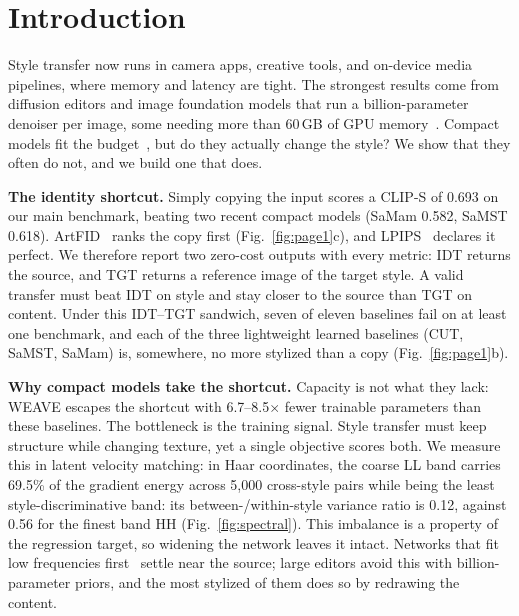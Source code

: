 \documentclass[conference]{IEEEtran}
\newcommand{\clips}{CLIP-S}
\begin{document}
\section{Introduction}
\label{sec:intro}

Style transfer now runs in camera apps, creative tools, and on-device media pipelines, where memory
and latency are tight. The strongest results come from diffusion editors and image foundation models
that run a billion-parameter denoiser per image, some needing more than 60\,GB of GPU
memory~\cite{wu2025qwenimagetechnicalreport,blackforestlabs2025flux2}. Compact models fit the
budget~\cite{wang2023microast,liu2024samst,liu2024samam}, but do they actually change the style? We
show that they often do not, and we build one that does.

\noindent\textbf{The identity shortcut.} Simply copying the input scores a \clips{} of 0.693 on our
main benchmark, beating two recent compact models (SaMam 0.582, SaMST 0.618). ArtFID~\cite{wright2022artfid}
ranks the copy first (Fig.~\ref{fig:page1}c), and LPIPS~\cite{zhang2018unreasonable} declares it perfect.
We therefore report two zero-cost outputs with every metric: IDT returns the source, and TGT returns a
reference image of the target style. A valid transfer must beat IDT on style and stay closer to the
source than TGT on content. Under this IDT--TGT sandwich, seven of eleven baselines fail on at least one
benchmark, and each of the three lightweight learned baselines (CUT, SaMST, SaMam) is, somewhere, no more
stylized than a copy (Fig.~\ref{fig:page1}b).

\noindent\textbf{Why compact models take the shortcut.} Capacity is not what they lack: WEAVE
escapes the shortcut with 6.7--8.5$\times$ fewer trainable parameters than these baselines. The
bottleneck is the training signal. Style transfer must keep structure while changing texture, yet a
single objective scores both. We measure this in latent velocity matching: in Haar coordinates, the coarse
LL band carries
69.5\% of the gradient energy across 5{,}000 cross-style pairs while being the least style-discriminative
band: its between-/within-style variance ratio is 0.12, against 0.56 for the finest band HH
(Fig.~\ref{fig:spectral}). This imbalance is a property of the regression target, so widening the network
leaves it intact. Networks that fit low frequencies first~\cite{rahaman2019spectral,xu2022frequency} settle
near the source; large editors avoid this with billion-parameter priors, and the most stylized of them
does so by redrawing the content.
\end{document}
